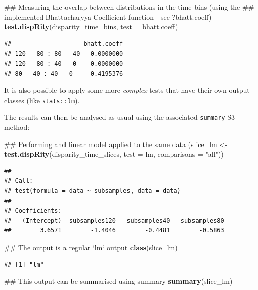 \documentclass[]{book}
\newenvironment{Shaded}{\begin{snugshade}}{\end{snugshade}}
\newcommand{\KeywordTok}[1]{\textcolor[rgb]{0.13,0.29,0.53}{\textbf{#1}}}
\newcommand{\DataTypeTok}[1]{\textcolor[rgb]{0.13,0.29,0.53}{#1}}
\newcommand{\StringTok}[1]{\textcolor[rgb]{0.31,0.60,0.02}{#1}}
\newcommand{\NormalTok}[1]{#1}
\theoremstyle{definition}
\theoremstyle{definition}
\theoremstyle{remark}
\begin{document}
\begin{Shaded}
\begin{Highlighting}[]
\NormalTok{## Measuring the overlap between distributions in the time bins (using the}
\NormalTok{## implemented Bhattacharyya Coefficient function - see ?bhatt.coeff)}
\KeywordTok{test.dispRity}\NormalTok{(disparity_time_bins, }\DataTypeTok{test =}\NormalTok{ bhatt.coeff)}
\end{Highlighting}
\end{Shaded}

\begin{verbatim}
##                    bhatt.coeff
## 120 - 80 : 80 - 40   0.0000000
## 120 - 80 : 40 - 0    0.0000000
## 80 - 40 : 40 - 0     0.4195376
\end{verbatim}

It is also possible to apply some more \emph{complex} tests that have
their own output classes (like \texttt{stats::lm}).

The results can then be analysed as usual using the associated
\texttt{summary} S3 method:

\begin{Shaded}
\begin{Highlighting}[]
\NormalTok{## Performing and linear model applied to the same data}
\NormalTok{(slice_lm <-}\StringTok{ }\KeywordTok{test.dispRity}\NormalTok{(disparity_time_slices, }\DataTypeTok{test =}\NormalTok{ lm,}
                            \DataTypeTok{comparisons =} \StringTok{"all"}\NormalTok{))}
\end{Highlighting}
\end{Shaded}

\begin{verbatim}
## 
## Call:
## test(formula = data ~ subsamples, data = data)
## 
## Coefficients:
##   (Intercept)  subsamples120   subsamples40   subsamples80  
##        3.6571        -1.4046        -0.4481        -0.5863
\end{verbatim}

\begin{Shaded}
\begin{Highlighting}[]
\NormalTok{## The output is a regular `lm` output}
\KeywordTok{class}\NormalTok{(slice_lm)}
\end{Highlighting}
\end{Shaded}

\begin{verbatim}
## [1] "lm"
\end{verbatim}

\begin{Shaded}
\begin{Highlighting}[]
\NormalTok{## This output can be summarised using summary}
\KeywordTok{summary}\NormalTok{(slice_lm)}
\end{Highlighting}
\end{Shaded}
\end{document}
